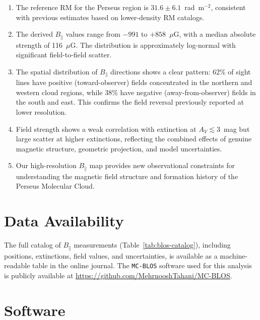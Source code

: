 \documentclass[twocolumn]{aastex701}
\begin{document}
\begin{enumerate}
    \item The reference RM for the Perseus region is $31.6 \pm 6.1$~rad~m$^{-2}$, consistent with previous estimates based on lower-density RM catalogs.

    \item The derived $B_\parallel$ values range from $-991$ to $+858$~$\mu$G, with a median absolute strength of 116~$\mu$G. The distribution is approximately log-normal with significant field-to-field scatter.

    \item The spatial distribution of $B_\parallel$ directions shows a clear pattern: 62\% of sight lines have positive (toward-observer) fields concentrated in the northern and western cloud regions, while 38\% have negative (away-from-observer) fields in the south and east. This confirms the field reversal previously reported at lower resolution.

    \item Field strength shows a weak correlation with extinction at $A_V \lesssim 3$~mag but large scatter at higher extinctions, reflecting the combined effects of genuine magnetic structure, geometric projection, and model uncertainties.

    \item Our high-resolution $B_\parallel$ map provides new observational constraints for understanding the magnetic field structure and formation history of the Perseus Molecular Cloud.
\end{enumerate}

\section{Data Availability}

The full catalog of $B_\parallel$ measurements (Table~\ref{tab:blos-catalog}), including positions, extinctions, field values, and uncertainties, is available as a machine-readable table in the online journal. The \texttt{MC-BLOS} software used for this analysis is publicly available at \url{https://github.com/MehrnooshTahani/MC-BLOS}.

\section{Software}
\end{document}
